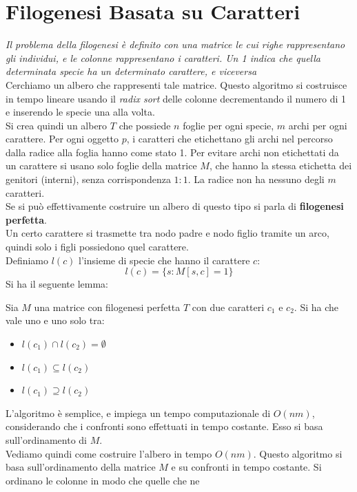 \documentclass[a4paper,12pt, oneside]{book}
\begin{document}
\section{Filogenesi Basata su Caratteri}
\textit{Il problema della filogenesi è definito con una matrice le cui
  righe rappresentano gli individui, e le 
  colonne rappresentano i caratteri. Un 1 indica che quella determinata
  specie ha un determinato carattere, e viceversa}\\
Cerchiamo un albero che rappresenti tale matrice. Questo algoritmo si
costruisce in tempo lineare usando il \textit{radix sort} delle
colonne decrementando il numero di 1 e inserendo le specie 
una alla volta.\\
Si crea quindi un albero $T$ che possiede $n$ foglie per ogni specie,
$m$ archi per ogni carattere. Per ogni oggetto $p$, i caratteri che
etichettano gli archi nel percorso dalla radice alla foglia 
hanno come stato 1. Per evitare archi non etichettati da un carattere
si usano solo foglie della matrice
$M$, che hanno la stessa etichetta dei genitori (interni), senza
corrispondenza $1 : 1$. La radice non ha nessuno degli $m$
caratteri. \\
Se si può effettivamente costruire un albero di questo tipo si parla
di \textbf{filogenesi perfetta}.\\
Un certo carattere si trasmette tra nodo padre e nodo figlio tramite
un arco, quindi solo i figli possiedono quel carattere. \\
Definiamo $l(c)$ l’insieme di specie che hanno il carattere $c$:
\[l(c)=\{s:M[s,c]=1\}\]
Si ha il seguente lemma:
\begin{lemma}
  Sia $M$ una matrice con filogenesi perfetta $T$ con due caratteri
  $c_1$ e $c_2$. Si ha che vale uno e uno solo tra:
  \begin{itemize}
    \item $l(c_1)\cap l(c_2)=\emptyset$
    \item $l(c_1)\subseteq l(c_2)$
    \item $l(c_1)\supseteq l(c_2)$
  \end{itemize}
\end{lemma}
L’algoritmo è semplice, e impiega un tempo computazionale di $O(nm)$,
considerando che i confronti sono effettuati in tempo costante. Esso
si basa sull’ordinamento di $M$.
\\
Vediamo quindi come costruire l'albero in tempo $O(nm)$. Questo
algoritmo si basa sull'ordinamento della matrice $M$ e su confronti in
tempo costante. Si ordinano le colonne in modo che quelle che ne
\end{document}
